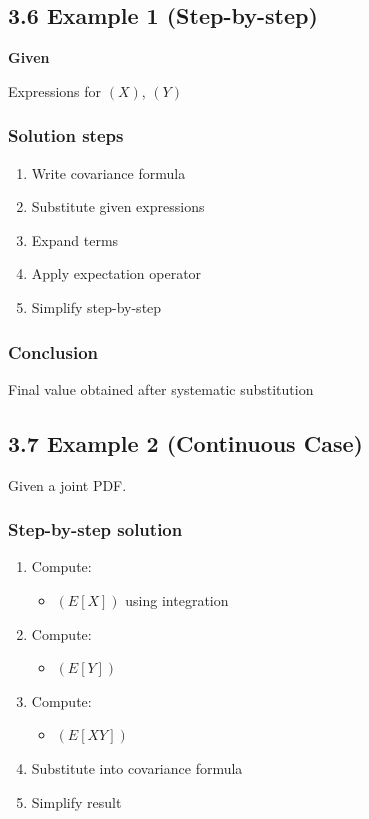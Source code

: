 \documentclass[12pt]{article}
\begin{document}
\subsection*{3.6 Example 1 (Step-by-step)}

\textbf{Given}

Expressions for $(X)$, $(Y)$

\subsubsection*{Solution steps}

\begin{enumerate}
\item Write covariance formula
\item Substitute given expressions
\item Expand terms
\item Apply expectation operator
\item Simplify step-by-step
\end{enumerate}

\subsubsection*{Conclusion}

Final value obtained after systematic substitution

\subsection*{3.7 Example 2 (Continuous Case)}

Given a joint PDF.

\subsubsection*{Step-by-step solution}

\begin{enumerate}
\item Compute:
\begin{itemize}
\item $(E[X])$ using integration
\end{itemize}
\item Compute:
\begin{itemize}
\item $(E[Y])$
\end{itemize}
\item Compute:
\begin{itemize}
\item $(E[XY])$
\end{itemize}
\item Substitute into covariance formula
\item Simplify result
\end{enumerate}
\end{document}
